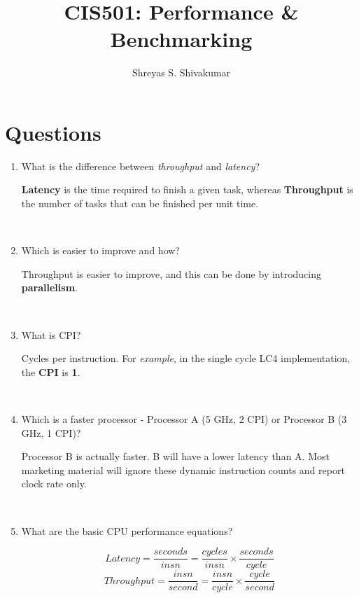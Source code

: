 \documentclass[12pt]{article}
\title{CIS501: Performance \& Benchmarking}
\author[1]{Shreyas S. Shivakumar}
\newenvironment{QandA}{\begin{enumerate}[label=\bfseries\arabic*.]\bfseries}
                      {\end{enumerate}}
\newenvironment{answered}{\par\quad\normalfont}{}
\begin{document}
\maketitle

\section{Questions}

\begin{QandA}
   \item What is the difference between \textit{throughput} and \textit{latency}?
        \begin{answered}
        \textbf{Latency} is the time required to finish a given task, whereas \textbf{Throughput} is the number of tasks that can be finished per unit time.
        \end{answered}
        
        \
        
    \item Which is easier to improve and how?
        \begin{answered}
        Throughput is easier to improve, and this can be done by introducing \textbf{parallelism}.
        \end{answered}
        
    \
        
    \item What is CPI?
        \begin{answered}
        Cycles per instruction. For \textit{example}, in the single cycle LC4 implementation, the \textbf{CPI} is \textbf{1}.
        \end{answered}
        
        \
        
    \item Which is a faster processor - Processor A (5 GHz, 2 CPI) or Processor B (3 GHz, 1 CPI)?
        \begin{answered}
        Processor B is actually faster. B will have a lower latency than A. Most marketing material will ignore these dynamic instruction counts and report clock rate only.
        \end{answered}
        
        \
        
    \item What are the basic CPU performance equations?
        \begin{answered}
        \begin{equation}
            Latency = \frac{seconds}{insn} = \frac{cycles}{insn} \times \frac{seconds}{cycle}
        \end{equation}
        \begin{equation}
            Throughput = \frac{insn}{second} = \frac{insn}{cycle} \times \frac{cycle}{second}
        \end{equation}        
        \end{answered}


\end{QandA}
\end{document}
